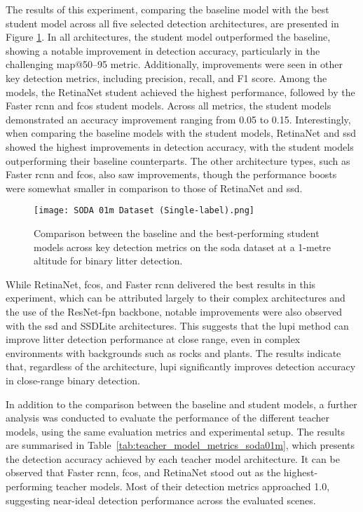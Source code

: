 The results of this experiment, comparing the baseline model with the best student model across all five selected detection architectures, are presented in Figure \ref{fig:soda01m_bar}. In all architectures, the student model outperformed the baseline, showing a notable improvement in detection accuracy, particularly in the challenging \gls{map}@50–95 metric. Additionally, improvements were seen in other key detection metrics, including precision, recall, and F1 score. Among the models, the RetinaNet student achieved the highest performance, followed by the Faster \gls{rcnn} and \gls{fcos} student models. Across all metrics, the student models demonstrated an accuracy improvement ranging from 0.05 to 0.15. Interestingly, when comparing the baseline models with the student models, RetinaNet and \gls{ssd} showed the highest improvements in detection accuracy, with the student models outperforming their baseline counterparts. The other architecture types, such as Faster \gls{rcnn} and \gls{fcos}, also saw improvements, though the performance boosts were somewhat smaller in comparison to those of RetinaNet and \gls{ssd}.

\begin{figure}[!ht]
    \centering
    \texttt{[image: SODA 01m Dataset (Single-label).png]}
    \caption{Comparison between the baseline and the best-performing student models across key detection metrics on the \gls{soda} dataset at a 1-metre altitude for binary litter detection.}
    \label{fig:soda01m_bar}
\end{figure}

While RetinaNet, \gls{fcos}, and Faster \gls{rcnn} delivered the best results in this experiment, which can be attributed largely to their complex architectures and the use of the ResNet-\gls{fpn} backbone, notable improvements were also observed with the \gls{ssd} and SSDLite architectures. This suggests that the \gls{lupi} method can improve litter detection performance at close range, even in complex environments with backgrounds such as rocks and plants. The results indicate that, regardless of the architecture, \gls{lupi} significantly improves detection accuracy in close-range binary detection.

In addition to the comparison between the baseline and student models, a further analysis was conducted to evaluate the performance of the different teacher models, using the same evaluation metrics and experimental setup. The results are summarised in Table~\ref{tab:teacher_model_metrics_soda01m}, which presents the detection accuracy achieved by each teacher model architecture. It can be observed that Faster \gls{rcnn}, \gls{fcos}, and RetinaNet stood out as the highest-performing teacher models. Most of their detection metrics approached 1.0, suggesting near-ideal detection performance across the evaluated scenes. 

